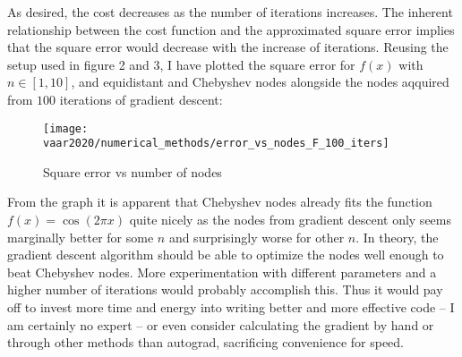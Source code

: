 As desired, the cost decreases as the number of iterations increases. The inherent relationship between the cost function and the approximated square error implies that the square error would decrease with the increase of iterations. Reusing the setup used in figure 2 and 3, I have plotted the square error for $f(x)$ with $n\in[1,10]$, and equidistant and Chebyshev nodes alongside the nodes aqquired from $100$ iterations of gradient descent:
\begin{figure}[H]
  \begin{center}
  \caption{Square error vs number of nodes}\texttt{[image: vaar2020/numerical\_methods/error\_vs\_nodes\_F\_100\_iters]}
\end{center}
\end{figure}
From the graph it is apparent that Chebyshev nodes already fits the function $f(x)=\cos(2\pi x)$ quite nicely as the nodes from gradient descent only seems marginally better for some $n$ and surprisingly worse for other $n$.
\newline In theory, the gradient descent algorithm should be able to optimize the nodes well enough to beat Chebyshev nodes. More experimentation with different parameters and a higher number of iterations would probably accomplish this. Thus it would pay off to invest more time and energy into writing better and more effective code -- I am certainly no expert -- or even consider calculating the gradient by hand or through other methods than autograd, sacrificing convenience for speed.

